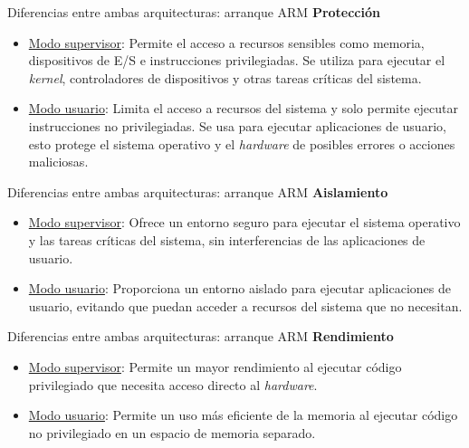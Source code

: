 \begin{frame}{Diferencias entre ambas arquitecturas: arranque ARM}
	\textbf{Protección}
	
	\begin{itemize} \setlength\itemsep{0pt}
		\item \underline{Modo supervisor}: Permite el acceso a recursos sensibles como memoria, dispositivos de E/S e instrucciones privilegiadas. Se utiliza para ejecutar el \textit{kernel}, controladores de dispositivos y otras tareas críticas del sistema.
		
		\item \underline{Modo usuario}: Limita el acceso a recursos del sistema y solo permite ejecutar instrucciones no privilegiadas. Se usa para ejecutar aplicaciones de usuario, esto protege el sistema operativo y el \textit{hardware} de posibles errores o acciones maliciosas.
	\end{itemize}
\end{frame}

\begin{frame}{Diferencias entre ambas arquitecturas: arranque ARM}
	\textbf{Aislamiento}
	
	\begin{itemize} \setlength\itemsep{0pt}
		\item \underline{Modo supervisor}: Ofrece un entorno seguro para ejecutar el sistema operativo y las tareas críticas del sistema, sin interferencias de las aplicaciones de usuario.
		
		\item \underline{Modo usuario}: Proporciona un entorno aislado para ejecutar aplicaciones de usuario, evitando que puedan acceder a recursos del sistema que no necesitan.
	\end{itemize}
\end{frame}

\begin{frame}{Diferencias entre ambas arquitecturas: arranque ARM}
	\textbf{Rendimiento}
	
	\begin{itemize} \setlength\itemsep{0pt}
		\item \underline{Modo supervisor}: Permite un mayor rendimiento al ejecutar código privilegiado que necesita acceso directo al \textit{hardware}.
		
		\item \underline{Modo usuario}: Permite un uso más eficiente de la memoria al ejecutar código no privilegiado en un espacio de memoria separado.
	\end{itemize}
\end{frame}


